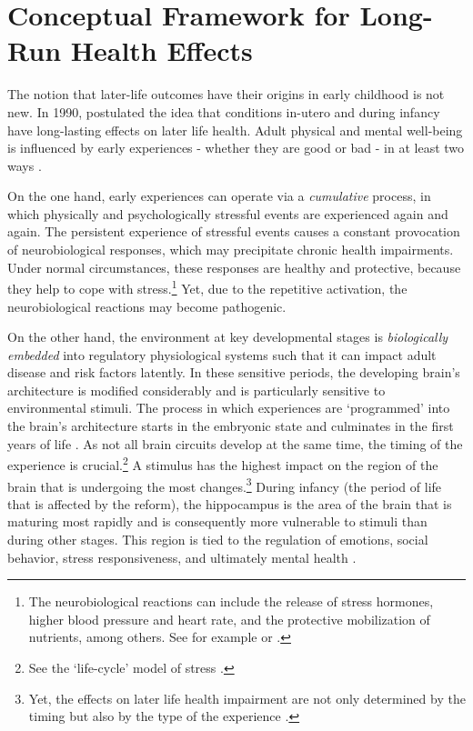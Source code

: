 \documentclass[11pt, a4paper, draft]{article} %
\begin{document}
\bigskip
\section[Framework]{Conceptual Framework for Long-Run Health Effects}\label{sec:framework}
The notion that later-life outcomes have their origins in early childhood is not new. In 1990, \citeauthor{Barker1990origins} postulated the idea that conditions in-utero and during infancy have long-lasting effects on later life health. Adult physical and mental well-being is influenced by early experiences - whether they are good or bad - in at least two ways \citep{shonkoff2009neuroscience}.

On the one hand, early experiences can operate via a \emph{cumulative} process, in which physically and psychologically stressful events are experienced again and again. The persistent experience of stressful events causes a constant provocation of neurobiological responses, which may precipitate chronic health impairments. Under normal circumstances, these responses are healthy and protective, because they help to cope with stress.\footnote{The neurobiological reactions can include the release of stress hormones, higher blood pressure and heart rate, and the protective mobilization of nutrients, among others. See for example \cite{mcewen1998stress} or \cite{shonkoff2009neuroscience}.} Yet, due to the repetitive activation, the neurobiological reactions may become pathogenic.

On the other hand, the environment at key developmental stages is \emph{biologically embedded} into regulatory physiological systems such that it can impact adult disease and risk factors latently. In these sensitive periods, the developing brain's architecture is modified considerably and is particularly sensitive to environmental stimuli. The process in which experiences are `programmed' into the brain's architecture starts in the embryonic state and culminates in the first years of life \citep{raikkonen2012early}. As not all brain circuits develop at the same time, the timing of the experience is crucial.\footnote{See the `life-cycle' model of stress \citep{lupien2009effects}.} A stimulus has the highest impact on the region of the brain that is undergoing the most changes.\footnote{Yet, the effects on later life health impairment are not only determined by the timing but also by the type of the experience \citep{raikkonen2012early}.} During infancy (the period of life that is affected by the reform), the hippocampus is the area of the brain that is maturing most rapidly and is consequently more vulnerable to stimuli than during other stages. This region is tied to the regulation of emotions, social behavior, stress responsiveness, and ultimately mental health \citep{center2016best,shonkoff2009neuroscience}. 
\end{document}
